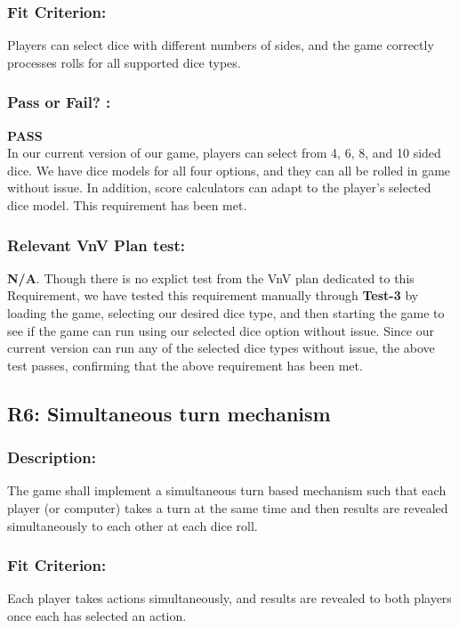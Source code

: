 \documentclass[12pt, titlepage]{article}
\begin{document}
\subsubsection*{Fit Criterion:} Players can select dice with different numbers of sides, and the game correctly processes rolls for all supported dice types.

\subsubsection*{Pass or Fail? :} 

 \noindent \textbf{PASS}\\
 
In our current version of our game, players can select from 4, 6, 8, and 10 sided dice. We have dice models for all four options, and they can all be rolled in game without issue. In addition, score calculators can adapt to the player's selected dice model. This requirement has been met.

\subsubsection*{Relevant VnV Plan test: } \textbf{N/A}. Though there is no explict test from the VnV plan dedicated to this Requirement, we have tested this requirement manually through \textbf{Test-3} by loading the game, selecting our desired dice type, and then starting the game to see if the game can run using our selected dice option without issue. Since our current version can run any of the selected dice types without issue, the above test passes, confirming that the above requirement has been met.


\subsection{R6: Simultaneous turn mechanism} 
\label{R6} 

\subsubsection*{Description:}The game shall implement a simultaneous turn based mechanism such that each player (or computer) takes a turn at the same time and then results are revealed simultaneously to each other at each dice roll.

\subsubsection*{Fit Criterion:} Each player takes actions simultaneously, and results are revealed to both players once each has selected an action.
\end{document}
